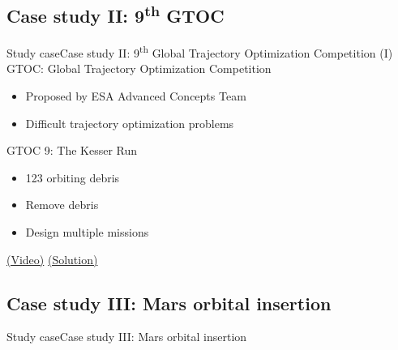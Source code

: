 \documentclass[10pt,compress]{beamer} %
\begin{document}
\subsection{Case study II: 9\textsuperscript{th} GTOC}
\begin{frame}{Study case}{Case study II: 9\textsuperscript{th} Global Trajectory Optimization Competition (I)}
    GTOC: Global Trajectory Optimization Competition
    \begin{itemize}
        \item Proposed by ESA Advanced Concepts Team
        \item Difficult trajectory optimization problems
    \end{itemize}

    GTOC 9: The Kesser Run
    \begin{itemize}
        \item 123 orbiting debris
        \item Remove debris
        \item Design multiple missions
    \end{itemize}
    \href{https://www.youtube.com/watch?v=zvxZx-QnqQ0}{(Video)}
    \href{https://www.youtube.com/watch?v=5CQNG6OIbZM}{(Solution)}
\end{frame}

\subsection{Case study III: Mars orbital insertion}
\begin{frame}{Study case}{Case study III: Mars orbital insertion}
    \setlength{\fboxrule}{0pt}
\end{frame}
\end{document}

